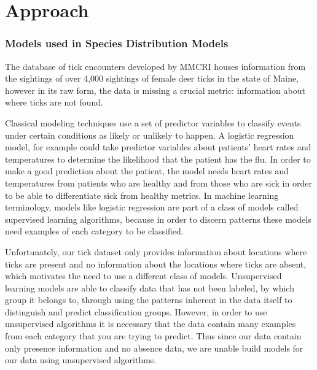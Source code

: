 
\chapter{Approach} %

\label{Chapter2} 



\subsection{Models used in Species Distribution Models}
\noindent The database of tick encounters developed by MMCRI houses information from the sightings of over 4,000 sightings of female deer ticks in the state of Maine, however in its raw form, the data is missing a crucial metric: information about where ticks are not found. \newline

\noindent Classical modeling techniques use a set of predictor variables to classify events under certain conditions as likely or unlikely to happen. A logistic regression model, for example could take predictor variables about patients' heart rates and temperatures to determine the likelihood that the patient has the flu. In order to make a good prediction about the patient, the model needs heart rates and temperatures from patients who are healthy and from those who are sick in order to be able to differentiate sick from healthy metrics. In machine learning terminology, models like logistic regression are part of a class of models called supervised learning algorithms, because in order to discern patterns these models need examples of each category to be classified. \newline

\noindent Unfortunately, our tick dataset only provides information about locations where ticks are present and no information about the locations where ticks are absent, which motivates the need to use a different class of models. Unsupervised learning models are able to classify data that has not been labeled, by which group it belongs to, through using the patterns inherent in the data itself to distinguish and predict classification groups. However, in order to use unsupervised algorithms it is necessary that the data contain many examples from each category that you are trying to predict. Thus since our data contain only presence information and no absence data, we are unable build models for our data using unsupervised algorithms. \newline

